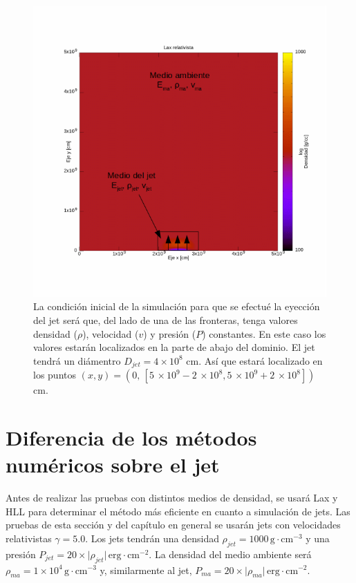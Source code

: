 \documentclass[12pt,a4paper]{book}
\begin{document}
\begin{figure}
\centering
\includegraphics[scale=0.5]{./Figuras/Pruebas/Prueba_jet/jet_ejemplo}
\caption{\label{fig:condicion_inicial_jet}La condición inicial de la simulación para que se efectué la eyección del jet será que, del lado de una de las fronteras, tenga valores  densidad ($\rho$), velocidad ($v$) y presión ($P$) constantes. En este caso los valores estarán localizados en la parte de abajo del dominio. El jet tendrá un diámentro $D_{jet} = 4 \times 10^{8}$ cm. Así que estará localizado en los puntos $(x,y) = (0, \, [5\, \times 10^9 - 2\, \times 10^8, 5\, \times 10^9 + 2\, \times 10^8] )$ cm.}
\end{figure}



\section{Diferencia de los métodos numéricos sobre el jet}

Antes de realizar las pruebas con distintos medios de densidad, se usará Lax y HLL para determinar el método más eficiente en cuanto a simulación de jets. Las pruebas de esta sección y del capítulo en general se usarán jets con velocidades relativistas $\gamma = 5.0$. Los jets tendrán una densidad $\rho_{jet} = 1000 \, \mathrm{g} \cdot \mathrm{cm}^{-3}$ y una presión $P_{jet} = 20 \times \lvert \rho_{jet} \rvert \, \mathrm{erg} \cdot \mathrm{cm}^{-2}$. La densidad del medio ambiente será $\rho_{ma} = 1 \times 10^{4} \, \mathrm{g} \cdot \mathrm{cm}^{-3}$ y, similarmente al jet, $P_{ma} = 20 \times \lvert \rho_{ma} \rvert \, \mathrm{erg} \cdot \mathrm{cm}^{-2}$.
\end{document}
